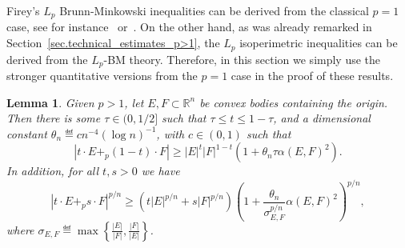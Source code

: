 \documentclass[a4paper, 10pt, twoside]{amsart}
\numberwithin{equation}{section}
\newcommand{\lemmname}{Lemma}
\theoremstyle{plain}
\newtheorem{lemma}[theorem]{\lemmname}
\theoremstyle{definition}
\begin{document}
Firey's $L_p$ Brunn-Minkowski inequalities can be derived from the classical $p=1$ case, see for instance~\cite[Thm.~7.6.3]{boroczky2025isoperimetric} or~\cite{firey1962p}. On the other hand, as was already remarked in Section~\ref{sec.technical_estimates_p>1}, the $L_p$ isoperimetric inequalities can be derived from the $L_p$-BM theory. Therefore, in this section we simply use the stronger quantitative versions from the $p=1$ case in the proof of these results. 

\begin{lemma}\label{lemma.quantitative_LpBM}
    Given $p > 1$, let $E,F \subset \mathbb{R}^n$ be convex bodies containing the origin. Then there is some $\tau \in (0,1/2]$ such that $\tau \le t \le 1 - \tau$, and a dimensional constant $\theta_n \eqdef cn^{-4}{(\log n)}^{-1}$, with $c \in (0,1)$ such that
    \begin{equation}
        |t\cdot E +_p (1-t) \cdot F| \ge 
        |E|^t|F|^{1-t} 
        \left(
            1 + \theta_n \tau {\alpha(E,F)}^2
        \right).
    \end{equation}
    In addition, for all $t,s > 0$ we have 
    \begin{equation}
        {|t\cdot E +_p s\cdot F|}^{p/n} 
        \ge 
        \left(
            t {|E|}^{p/n} + s {|F|}^{p/n}
        \right)
        {\left(
            1 + \frac{\theta_n}{
                \sigma^{p/n}_{E,F}
            } {\alpha(E,F)}^2
        \right)}^{p/n},
    \end{equation}
    where $\sigma_{E,F} \eqdef \max \left\{
        \frac{|E|}{|F|},\frac{|F|}{|E|}
    \right\}$. 
\end{lemma}
\end{document}
